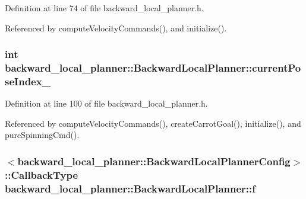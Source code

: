 Definition at line 74 of file backward\+\_\+local\+\_\+planner.\+h.



Referenced by compute\+Velocity\+Commands(), and initialize().

\subsubsection[{\texorpdfstring{current\+Pose\+Index\+\_\+}{currentPoseIndex_}}]{\setlength{\rightskip}{0pt plus 5cm}int backward\+\_\+local\+\_\+planner\+::\+Backward\+Local\+Planner\+::current\+Pose\+Index\+\_\+\hspace{0.3cm}{\ttfamily [private]}}\hypertarget{classbackward__local__planner_1_1BackwardLocalPlanner_af2485562720c0ce3c895debdbdfc89f3}{}\label{classbackward__local__planner_1_1BackwardLocalPlanner_af2485562720c0ce3c895debdbdfc89f3}


Definition at line 100 of file backward\+\_\+local\+\_\+planner.\+h.



Referenced by compute\+Velocity\+Commands(), create\+Carrot\+Goal(), initialize(), and pure\+Spinning\+Cmd().

\subsubsection[{\texorpdfstring{f}{f}}]{$<$backward\+\_\+local\+\_\+planner\+::\+Backward\+Local\+Planner\+Config$>$\+::Callback\+Type backward\+\_\+local\+\_\+planner\+::\+Backward\+Local\+Planner\+::f\hspace{0.3cm}{\ttfamily [private]}}\hypertarget{classbackward__local__planner_1_1BackwardLocalPlanner_a6ef8d7b45a368abb6561ffd76f46f098}{}\label{classbackward__local__planner_1_1BackwardLocalPlanner_a6ef8d7b45a368abb6561ffd76f46f098}


